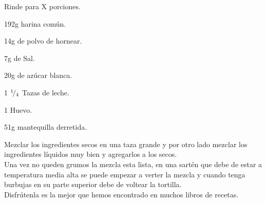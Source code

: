 
Rinde para X porciones.\\

\begin{ingredientes}
\item 192g harina común.
\item 14g de polvo de hornear.
\item 7g de Sal.
\item 20g de azúcar blanca.
\item 1 ${}^{1}\!/_{4}$ Tazas de leche.
\item 1 Huevo.
\item 51g mantequilla derretida.
\end{ingredientes}
\preparacion

Mezclar los ingredientes secos en una taza grande y por otro lado mezclar los ingredientes líquidos muy bien y agregarlos a los secos.\\

Una vez no queden grumos la mezcla esta lista, en una sartén que debe de estar a temperatura media alta se puede empezar a verter la mezcla y cuando tenga burbujas en su parte superior debe de voltear la tortilla.\\

Disfrútenla es la mejor que hemos encontrado en muchos libros de recetas.

